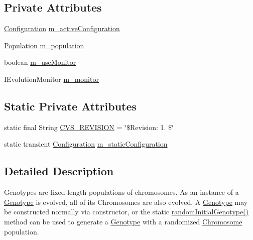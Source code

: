 \subsection*{Private Attributes}
\begin{DoxyCompactItemize}
\item 
\hyperlink{classorg_1_1jgap_1_1_configuration}{Configuration} \hyperlink{classorg_1_1jgap_1_1_genotype_aeb3fac2610b8ef8fa8599fcac1b6a199}{m\-\_\-active\-Configuration}
\item 
\hyperlink{classorg_1_1jgap_1_1_population}{Population} \hyperlink{classorg_1_1jgap_1_1_genotype_aa2ba4539110aaa8d853c808679f4f0e2}{m\-\_\-population}
\item 
boolean \hyperlink{classorg_1_1jgap_1_1_genotype_ab1b1b976deab7f2faea463d1b8d52abe}{m\-\_\-use\-Monitor}
\item 
I\-Evolution\-Monitor \hyperlink{classorg_1_1jgap_1_1_genotype_acac1218542ab91833483ebd42ac8636b}{m\-\_\-monitor}
\end{DoxyCompactItemize}
\subsection*{Static Private Attributes}
\begin{DoxyCompactItemize}
\item 
static final String \hyperlink{classorg_1_1jgap_1_1_genotype_ac9f8e9d203b7a4efdf8c2e32a08f84bb}{C\-V\-S\-\_\-\-R\-E\-V\-I\-S\-I\-O\-N} = \char`\"{}\$Revision\-: 1. \$\char`\"{}
\item 
static transient \hyperlink{classorg_1_1jgap_1_1_configuration}{Configuration} \hyperlink{classorg_1_1jgap_1_1_genotype_a8b93a0b2044e40520d4a966ef3ae0bbe}{m\-\_\-static\-Configuration}
\end{DoxyCompactItemize}


\subsection{Detailed Description}
Genotypes are fixed-\/length populations of chromosomes. As an instance of a \hyperlink{classorg_1_1jgap_1_1_genotype}{Genotype} is evolved, all of its Chromosomes are also evolved. A \hyperlink{classorg_1_1jgap_1_1_genotype}{Genotype} may be constructed normally via constructor, or the static \hyperlink{classorg_1_1jgap_1_1_genotype_a930184e2920b4642f20d0b8bc8412005}{random\-Initial\-Genotype()} method can be used to generate a \hyperlink{classorg_1_1jgap_1_1_genotype}{Genotype} with a randomized \hyperlink{classorg_1_1jgap_1_1_chromosome}{Chromosome} population. 

